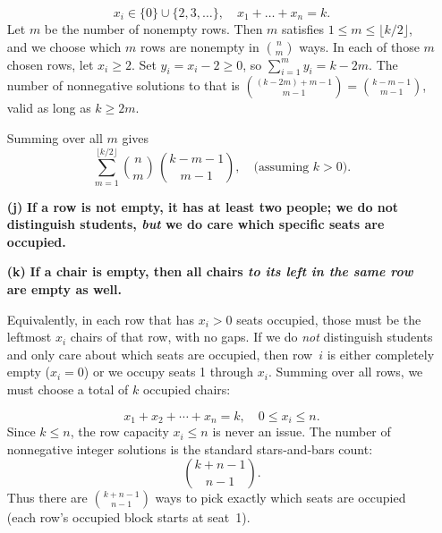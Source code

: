 \documentclass[docmute]{article}
\begin{document}
\begin{enumerate}
    \[
      x_i \in \{0\}\cup \{2,3,\dots\}, 
      \quad x_1+\dots+x_n = k.
    \]
    Let $m$ be the number of nonempty rows.  Then $m$ satisfies $1 \le m \le \lfloor k/2 \rfloor$, and we choose which $m$ rows are nonempty in $\binom{n}{m}$ ways.  In each of those $m$ chosen rows, let $x_i \ge2$.  Set $y_i = x_i - 2 \ge 0$, so $\sum_{i=1}^m y_i = k - 2m.$  The number of nonnegative solutions to that is $\binom{(k-2m) + m -1}{m-1} = \binom{k - m -1}{m-1}$, valid as long as $k \ge 2m.$  

    Summing over all $m$ gives
    \[
      \sum_{m=1}^{\lfloor k/2 \rfloor}
        \binom{n}{m}\,\binom{k - m - 1}{m-1},
      \quad
      \text{(assuming $k>0$).}
    \]

  \item[\textbf{(j)}]
    \textbf{If a row is not empty, it has at least two people; we do not distinguish students, \emph{but} we do care which specific seats are occupied.}



  \item[\textbf{(k)}]
    \textbf{If a chair is empty, then all chairs \emph{to its left in the same row} are empty as well.}

    Equivalently, in each row that has $x_i>0$ seats occupied, those must be the leftmost $x_i$ chairs of that row, with no gaps.  If we do \emph{not} distinguish students and only care about which seats are occupied, then row~$i$ is either completely empty ($x_i=0$) or we occupy seats 1 through $x_i$.  Summing over all rows, we must choose a total of $k$ occupied chairs:

    \[
      x_1 + x_2 + \cdots + x_n = k,
      \quad 0 \le x_i \le n.
    \]
    Since $k \le n$, the row capacity $x_i \le n$ is never an issue.  The number of nonnegative integer solutions is the standard stars‐and‐bars count:
    \[
      \binom{k + n - 1}{n - 1}.
    \]
    Thus there are $\binom{k + n - 1}{n - 1}$ ways to pick exactly which seats are occupied (each row’s occupied block starts at seat~1).

\end{enumerate}
\end{document}

